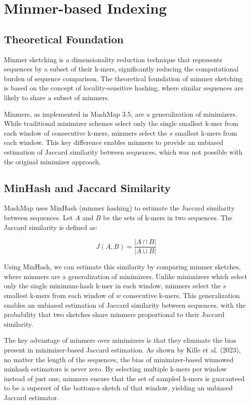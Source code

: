 \documentclass{article}
\begin{document}
\section{Minmer-based Indexing}

\subsection{Theoretical Foundation}

Minmer sketching is a dimensionality reduction technique that represents sequences by a subset of their k-mers, significantly reducing the computational burden of sequence comparison. The theoretical foundation of minmer sketching is based on the concept of locality-sensitive hashing, where similar sequences are likely to share a subset of minmers.

Minmers, as implemented in MashMap 3.5, are a generalization of minimizers. While traditional minimizer schemes select only the single smallest k-mer from each window of consecutive k-mers, minmers select the \(s\) smallest k-mers from each window. This key difference enables minmers to provide an unbiased estimation of Jaccard similarity between sequences, which was not possible with the original minimizer approach.

\subsection{MinHash and Jaccard Similarity}

MashMap uses MinHash (minmer hashing) to estimate the Jaccard similarity between sequences. Let \(A\) and \(B\) be the sets of k-mers in two sequences. The Jaccard similarity is defined as:

\begin{equation}
J(A, B) = \frac{|A \cap B|}{|A \cup B|}
\end{equation}

Using MinHash, we can estimate this similarity by comparing minmer sketches, where minmers are a generalization of minimizers. Unlike minimizers which select only the single minimum-hash k-mer in each window, minmers select the \(s\) smallest k-mers from each window of \(w\) consecutive k-mers. This generalization enables an unbiased estimation of Jaccard similarity between sequences, with the probability that two sketches share minmers proportional to their Jaccard similarity.

The key advantage of minmers over minimizers is that they eliminate the bias present in minimizer-based Jaccard estimation. As shown by Kille et al. (2023), no matter the length of the sequences, the bias of minimizer-based winnowed minhash estimators is never zero. By selecting multiple k-mers per window instead of just one, minmers ensure that the set of sampled k-mers is guaranteed to be a superset of the bottom-s sketch of that window, yielding an unbiased Jaccard estimator.
\end{document}
